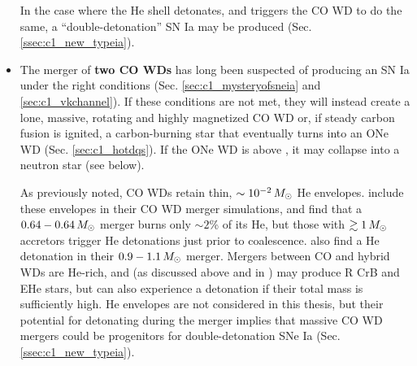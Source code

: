 \begin{itemize}



In the case where the He shell detonates, and triggers the CO WD to do the same, a ``double-detonation'' SN Ia may be produced (Sec. \ref{ssec:c1_new_typeia}).

	\item The merger of {\bf two CO WDs} has long been suspected of producing an SN Ia under the right conditions (Sec. \ref{sec:c1_mysteryofsneia} and \ref{sec:c1_vkchannel}).  If these conditions are not met, they will instead create a lone, massive, rotating and highly magnetized CO WD or, if steady carbon fusion is ignited, a carbon-burning star that eventually turns into an ONe WD (Sec. \ref{sec:c1_hotdqs}).  If the ONe WD is above \Mch, it may collapse into a neutron star (see below).

As previously noted, CO WDs retain thin, $\sim10^{-2}\,\Msun$ He envelopes.  \cite{rask+12} include these envelopes in their CO WD merger simulations, and find that a $0.64-0.64\,\Msun$ merger burns only $\sim2$\% of its He, but those with $\gtrsim1\,\Msun$ accretors trigger He detonations just prior to coalescence.  \cite{pakm+13} also find a He detonation in their $0.9-1.1\,\Msun$ merger.  Mergers between CO and hybrid WDs are He-rich, and (as discussed above and in \cite{dan+14}) may produce R CrB and EHe stars, but can also experience a detonation if their total mass is sufficiently high.  He envelopes are not considered in this thesis, but their potential for detonating during the merger implies that massive CO WD mergers could be progenitors for double-detonation SNe Ia (Sec. \ref{ssec:c1_new_typeia}).


\end{itemize}
